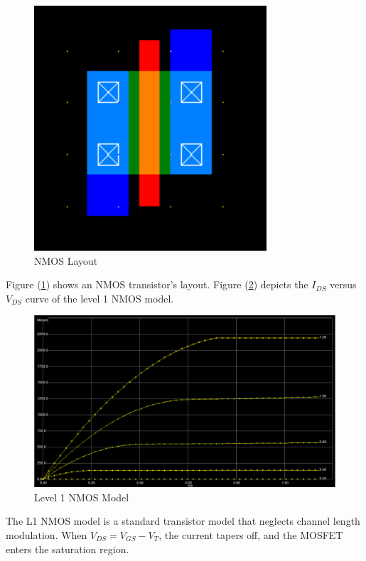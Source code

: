\FloatBarrier

\begin{figure}[h!]
	\centering
	\includegraphics[scale=0.75]{../images/nmos.PNG}
	\caption{NMOS Layout}
	\label{fig:nmos}
\end{figure}

\FloatBarrier

Figure (\ref{fig:nmos}) shows an NMOS transistor's layout. Figure (\ref{fig:l1_mos}) depicts the $I_{DS}$ versus $V_{DS}$ curve of the level 1 NMOS model.

\FloatBarrier

\begin{figure}[h!]
	\centering
	\includegraphics[scale=0.75]{../images/l1_mos.PNG}
	\caption{Level 1 NMOS Model}
	\label{fig:l1_mos}
\end{figure}

\FloatBarrier

The L1 NMOS model is a standard transistor model that neglects channel length modulation.
When $V_{DS} = V_{GS} - V_{T}$, the current tapers off, and the MOSFET enters the saturation region.

